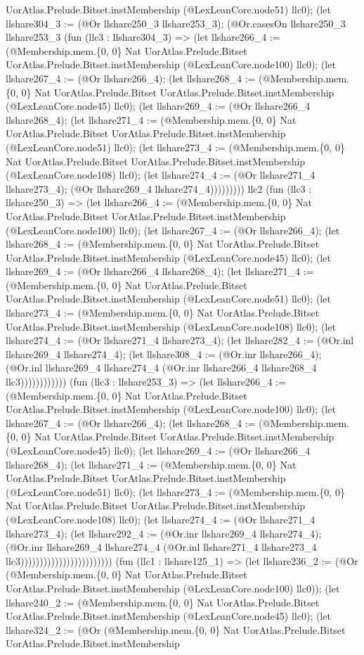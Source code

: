 \documentclass[11pt]{article}
\begin{document}
UorAtlas.Prelude.Bitset.instMembership (@LexLeanCore.node51) llc0); (let llshare304\_3 := (@Or llshare250\_3 llshare253\_3); (@Or.casesOn llshare250\_3 llshare253\_3 (fun (llc3 : llshare304\_3) => (let llshare266\_4 := (@Membership.mem.\{0, 0\} Nat UorAtlas.Prelude.Bitset UorAtlas.Prelude.Bitset.instMembership (@LexLeanCore.node100) llc0); (let llshare267\_4 := (@Or llshare266\_4); (let llshare268\_4 := (@Membership.mem.\{0, 0\} Nat UorAtlas.Prelude.Bitset UorAtlas.Prelude.Bitset.instMembership (@LexLeanCore.node45) llc0); (let llshare269\_4 := (@Or llshare266\_4 llshare268\_4); (let llshare271\_4 := (@Membership.mem.\{0, 0\} Nat UorAtlas.Prelude.Bitset UorAtlas.Prelude.Bitset.instMembership (@LexLeanCore.node51) llc0); (let llshare273\_4 := (@Membership.mem.\{0, 0\} Nat UorAtlas.Prelude.Bitset UorAtlas.Prelude.Bitset.instMembership (@LexLeanCore.node108) llc0); (let llshare274\_4 := (@Or llshare271\_4 llshare273\_4); (@Or llshare269\_4 llshare274\_4))))))))) llc2 (fun (llc3 : llshare250\_3) => (let llshare266\_4 := (@Membership.mem.\{0, 0\} Nat UorAtlas.Prelude.Bitset UorAtlas.Prelude.Bitset.instMembership (@LexLeanCore.node100) llc0); (let llshare267\_4 := (@Or llshare266\_4); (let llshare268\_4 := (@Membership.mem.\{0, 0\} Nat UorAtlas.Prelude.Bitset UorAtlas.Prelude.Bitset.instMembership (@LexLeanCore.node45) llc0); (let llshare269\_4 := (@Or llshare266\_4 llshare268\_4); (let llshare271\_4 := (@Membership.mem.\{0, 0\} Nat UorAtlas.Prelude.Bitset UorAtlas.Prelude.Bitset.instMembership (@LexLeanCore.node51) llc0); (let llshare273\_4 := (@Membership.mem.\{0, 0\} Nat UorAtlas.Prelude.Bitset UorAtlas.Prelude.Bitset.instMembership (@LexLeanCore.node108) llc0); (let llshare274\_4 := (@Or llshare271\_4 llshare273\_4); (let llshare282\_4 := (@Or.inl llshare269\_4 llshare274\_4); (let llshare308\_4 := (@Or.inr llshare266\_4); (@Or.inl llshare269\_4 llshare274\_4 (@Or.inr llshare266\_4 llshare268\_4 llc3)))))))))))) (fun (llc3 : llshare253\_3) => (let llshare266\_4 := (@Membership.mem.\{0, 0\} Nat UorAtlas.Prelude.Bitset UorAtlas.Prelude.Bitset.instMembership (@LexLeanCore.node100) llc0); (let llshare267\_4 := (@Or llshare266\_4); (let llshare268\_4 := (@Membership.mem.\{0, 0\} Nat UorAtlas.Prelude.Bitset UorAtlas.Prelude.Bitset.instMembership (@LexLeanCore.node45) llc0); (let llshare269\_4 := (@Or llshare266\_4 llshare268\_4); (let llshare271\_4 := (@Membership.mem.\{0, 0\} Nat UorAtlas.Prelude.Bitset UorAtlas.Prelude.Bitset.instMembership (@LexLeanCore.node51) llc0); (let llshare273\_4 := (@Membership.mem.\{0, 0\} Nat UorAtlas.Prelude.Bitset UorAtlas.Prelude.Bitset.instMembership (@LexLeanCore.node108) llc0); (let llshare274\_4 := (@Or llshare271\_4 llshare273\_4); (let llshare292\_4 := (@Or.inr llshare269\_4 llshare274\_4); (@Or.inr llshare269\_4 llshare274\_4 (@Or.inl llshare271\_4 llshare273\_4 llc3)))))))))))))))))))))))) (fun (llc1 : llshare125\_1) => (let llshare236\_2 := (@Or (@Membership.mem.\{0, 0\} Nat UorAtlas.Prelude.Bitset UorAtlas.Prelude.Bitset.instMembership (@LexLeanCore.node100) llc0)); (let llshare240\_2 := (@Membership.mem.\{0, 0\} Nat UorAtlas.Prelude.Bitset UorAtlas.Prelude.Bitset.instMembership (@LexLeanCore.node45) llc0); (let llshare324\_2 := (@Or (@Membership.mem.\{0, 0\} Nat UorAtlas.Prelude.Bitset UorAtlas.Prelude.Bitset.instMembership 
\end{document}
